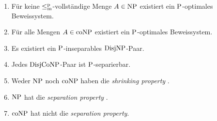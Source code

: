 \begin{corollary}
\begin{enumerate}[noitemsep,midpenalty=0]
        \item Für keine $\leqmp$-vollständige Menge $A\in\NP$ existiert ein $\P$-optimales Beweissystem.
        \item Für alle Mengen $A\in\coNP$ existiert ein $\P$-optimales Beweissystem.
        \item Es existiert ein $\P$-inseparables $\DisjNP$-Paar.
        \item Jedes $\DisjCoNP$-Paar ist $\P$-separierbar.
        \item Weder $\NP$ noch $\coNP$ haben die \emph{shrinking property} \parencite{glaser_shrinking_2011}.
        \item $\NP$ hat die \emph{separation property} \parencite{glaser_shrinking_2011}.
        \item $\coNP$ hat nicht die \emph{separation property}.
    \end{enumerate}
\end{corollary}
